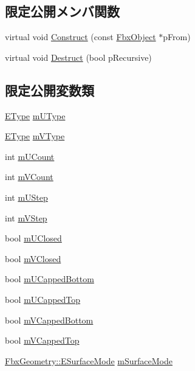 \subsection*{限定公開メンバ関数}
\begin{DoxyCompactItemize}
\item 
virtual void \hyperlink{class_fbx_patch_a82fbbc0a7ec019bbe69c976ab755b23e}{Construct} (const \hyperlink{class_fbx_object}{Fbx\+Object} $\ast$p\+From)
\item 
virtual void \hyperlink{class_fbx_patch_a7e094310626891214577dabe4ff145f9}{Destruct} (bool p\+Recursive)
\end{DoxyCompactItemize}
\subsection*{限定公開変数類}
\begin{DoxyCompactItemize}
\item 
\hyperlink{class_fbx_patch_ad669936e6b844a7a15fa30ec7c183fbb}{E\+Type} \hyperlink{class_fbx_patch_acaa83aceb1886696e545465523fd81a6}{m\+U\+Type}
\item 
\hyperlink{class_fbx_patch_ad669936e6b844a7a15fa30ec7c183fbb}{E\+Type} \hyperlink{class_fbx_patch_aa0e38cb994ef8741fbb163ca587cb2d6}{m\+V\+Type}
\item 
int \hyperlink{class_fbx_patch_a37cb5757a89fc364a13474dbb5d8055f}{m\+U\+Count}
\item 
int \hyperlink{class_fbx_patch_ae3d2c2e74b23f9b3d5eea59534ac1a85}{m\+V\+Count}
\item 
int \hyperlink{class_fbx_patch_a62d6ccb3ac152c21190a99ebea2efbf7}{m\+U\+Step}
\item 
int \hyperlink{class_fbx_patch_abeba80f7ee47a35509535ecd2edaf826}{m\+V\+Step}
\item 
bool \hyperlink{class_fbx_patch_aaae035422a96e362a395630fc69a487a}{m\+U\+Closed}
\item 
bool \hyperlink{class_fbx_patch_a4f616b59220bb25f795c288d12e297de}{m\+V\+Closed}
\item 
bool \hyperlink{class_fbx_patch_ace54e1a6eabcb3c3f8ca80a577e614bb}{m\+U\+Capped\+Bottom}
\item 
bool \hyperlink{class_fbx_patch_ae1ddc8b790090533b61a3d432e776f96}{m\+U\+Capped\+Top}
\item 
bool \hyperlink{class_fbx_patch_a5357f15e4e85f9e98c6660fa889a62c4}{m\+V\+Capped\+Bottom}
\item 
bool \hyperlink{class_fbx_patch_a8964253a7df60a4d9221f6c0a1ca4152}{m\+V\+Capped\+Top}
\item 
\hyperlink{class_fbx_geometry_adb9d2e34481a2cb40f1d783c665794db}{Fbx\+Geometry\+::\+E\+Surface\+Mode} \hyperlink{class_fbx_patch_abad06185040d5492cf5731e9ff80fee6}{m\+Surface\+Mode}
\end{DoxyCompactItemize}
